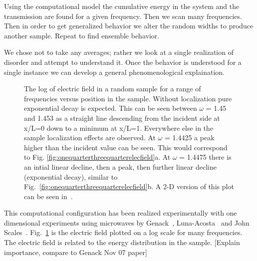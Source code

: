 \begin{comment}
We multiply 2x2 matrices together (for 2001 layers). However, because of rounding error (using fortran 90) we need to use self-embedding technique~\cite{1999_yamilov_selfembed}. This means doing 200 matrix multiplications (resulting in a single 2x2 matrix) and then multiplying that by the next 200 matrices. Repeat for a total of five chunks. No re-normalization of the 2x2 matrices is necessary.

The amount of numerical data of this one-dimensional system scales with the number of layers (2001). Usually one considers many frequencies and/or many realizations. The results give managable dataset sizes (on the order of Megabytes) and the computational time is on the order of minutes.
\end{comment}

Using the computational model the cumulative energy in the system and the transmission are found for a given frequency. Then we scan many frequencies. Then in order to get generalized behavior we alter the random widths to produce another sample. Repeat to find ensemble behavior. 

We chose not to take any averages; rather we look at a single realization of disorder and attempt to understand it. Once the behavior is understood for a single instance we can develop a general phenomenological explaination.

\begin{figure}
\vskip -0.5cm
\vskip -0.5cm
\caption{The log of electric field in a random sample for a range of frequencies versus position in the sample. Without localization pure exponential decay is expected. This can be seen between $\omega$ =  1.45 and 1.453 as a straight line descending from the incident side at x/L=0 down to a minimum at x/L=1. Everywhere else in the sample localization effects are observed. At $\omega$ = 1.4425 a peak higher than the incident value can be seen. This would correspond to Fig. \ref{fig:onequarterthreequarterelecfield}a. At $\omega$ = 1.4475 there is an intial linear decline, then a peak, then further linear decline  (exponential decay), similar to Fig.~\ref{fig:onequarterthreequarterelecfield}b. A 2-D version of this plot can be seen in~\cite{2006_Genack_1d}.}
\label{fig:electricFieldInSample}
\end{figure}

This computational configuration has been realized experimentally with one dimensional experiments using microwaves by Genack~\cite{2006_Genack_1d}, Luna-Acosta~\cite{2008_LunaAcosta} and John Scales~\cite{2006_Scales}. Fig.~\ref{fig:electricFieldInSample} is the electric field plotted on a log scale for many frequencies. The electric field is related to the energy distribution in the sample.  [Explain importance, compare to Genack Nov 07 paper]

